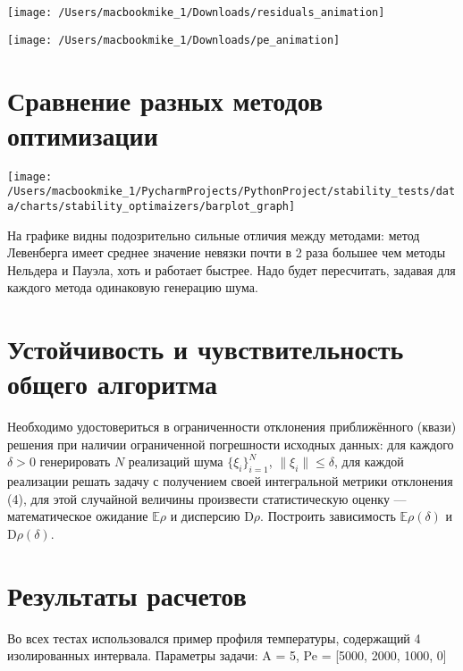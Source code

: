 \documentclass[12pt]{article}
\begin{document}
\begin{center}
    \begin{minipage}{0.48\textwidth}
        \texttt{[image: /Users/macbookmike\_1/Downloads/residuals\_animation]}
    \end{minipage}
    \hfill
    \begin{minipage}{0.48\textwidth}
        \texttt{[image: /Users/macbookmike\_1/Downloads/pe\_animation]}
    \end{minipage}
\end{center}

\section*{Сравнение разных методов оптимизации}

\begin{center}
    \texttt{[image: /Users/macbookmike\_1/PycharmProjects/PythonProject/stability\_tests/data/charts/stability\_optimaizers/barplot\_graph]}
\end{center}

На графике видны подозрительно сильные отличия между методами: метод Левенберга имеет среднее значение невязки почти в 2 раза
большее чем методы Нельдера и Пауэла, хоть и работает быстрее. Надо будет пересчитать, задавая для каждого метода одинаковую генерацию шума.

\section*{Устойчивость и чувствительность общего алгоритма}

Необходимо удостовериться в ограниченности отклонения приближённого (квази) решения при наличии ограниченной погрешности
исходных данных: для каждого $\delta > 0$ генерировать $N$ реализаций шума $\{\xi_i\}_{i=1}^N$, $\|\xi_i\| \leq \delta$,
для каждой реализации решать задачу с получением своей интегральной метрики отклонения (4),
для этой случайной величины произвести статистическую оценку — математическое
ожидание $\mathbb{E}\rho$ и дисперсию $\mathrm{D}\rho$. Построить зависимость $\mathbb{E}\rho(\delta)$ и $\mathrm{D}\rho(\delta)$.

\section*{Результаты расчетов}
Во всех тестах использовался пример профиля температуры, содержащий 4 изолированных интервала. Параметры задачи: A = 5, Pe = [5000, 2000, 1000, 0]
\end{document}
